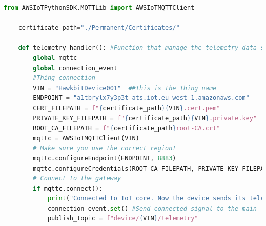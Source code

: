 \begin{lstlisting}[language=Python, caption={MQTT connection to the IoT Core AWS service}, label=lst:MQTTConnection]
    from AWSIoTPythonSDK.MQTTLib import AWSIoTMQTTClient

    certificate_path="./Permanent/Certificates/"

    def telemetry_handler(): #Function that manage the telemetry data sending to IoTCore via mqtt protocol
        global mqttc
        global connection_event
        #Thing connection
        VIN = "HawkbitDevice001"  ##This is the Thing name
        ENDPOINT = "a1tbrylx7y3p3t-ats.iot.eu-west-1.amazonaws.com"
        CERT_FILEPATH = f"{certificate_path}{VIN}.cert.pem"
        PRIVATE_KEY_FILEPATH = f"{certificate_path}{VIN}.private.key"
        ROOT_CA_FILEPATH = f"{certificate_path}root-CA.crt"
        mqttc = AWSIoTMQTTClient(VIN)
        # Make sure you use the correct region!
        mqttc.configureEndpoint(ENDPOINT, 8883)
        mqttc.configureCredentials(ROOT_CA_FILEPATH, PRIVATE_KEY_FILEPATH, CERT_FILEPATH)
        # Connect to the gateway
        if mqttc.connect():
            print("Connected to IoT core. Now the device sends its telemetry every 1 seconds")
            connection_event.set() #Send connected signal to the main
            publish_topic = f"device/{VIN}/telemetry"
\end{lstlisting}

